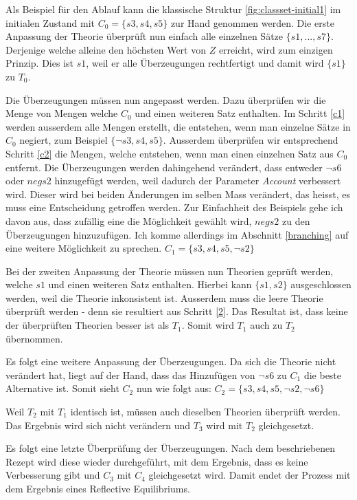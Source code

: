 \documentclass{article}
\begin{document}
 Als Beispiel für den Ablauf kann die klassische Struktur \ref{fig:classset-initial1} im initialen Zustand mit $C_0 = \{s3, s4, s5\}$ zur Hand genommen werden. Die erste Anpassung der Theorie überprüft nun einfach alle einzelnen Sätze $\{s1,...,s7\}$. Derjenige welche alleine den höchsten Wert von $Z$ erreicht, wird zum einzigen Prinzip. Dies ist $s1$, weil er alle Überzeugungen rechtfertigt und damit wird $\{s1\}$ zu $T_0$.
 
 Die Überzeugungen müssen nun angepasst werden. Dazu überprüfen wir die Menge von Mengen welche $C_0$ und einen weiteren Satz enthalten. Im Schritt \ref{c1} werden ausserdem alle Mengen erstellt, die entstehen, wenn man einzelne Sätze in $C_0$ negiert, zum Beispiel $\{\lnot s3, s4, s5\}$. Ausserdem überprüfen wir entsprechend Schritt \ref{c2} die Mengen, welche entstehen, wenn man einen einzelnen Satz aus $C_0$ entfernt. Die Überzeugungen werden dahingehend verändert, dass entweder $\neg s6$ oder $neg s2$ hinzugefügt werden, weil dadurch der Parameter \textit{Account} verbessert wird. Dieser wird bei beiden Änderungen im selben Mass verändert, das heisst, es muss eine Entscheidung getroffen werden. Zur Einfachheit des Beispiels gehe ich davon aus, dass zufällig eine die Möglichkeit gewählt wird, $neg s2$ zu den Überzeugungen hinzuzufügen. Ich komme allerdings im Abschnitt \ref{branching} auf eine weitere Möglichkeit zu sprechen. $C_1 = \{s3, s4, s5, \neg s2\}$
 
 Bei der zweiten Anpassung der Theorie müssen nun Theorien geprüft werden, welche $s1$ und einen weiteren Satz enthalten. Hierbei kann $\{s1,s2\}$ ausgeschlossen werden, weil die Theorie inkonsistent ist. Ausserdem muss die leere Theorie überprüft werden - denn sie resultiert aus Schritt \ref{2}. Das Resultat ist, dass keine der überprüften Theorien besser ist als $T_1$. Somit wird $T_1$ auch zu $T_2$ übernommen.
 
 Es folgt eine weitere Anpassung der Überzeugungen. Da sich die Theorie nicht verändert hat, liegt auf der Hand, dass das Hinzufügen von $\neg s6$ zu $C_1$ die beste Alternative ist. Somit sieht $C_2$ nun wie folgt aus: $C_2 = \{s3, s4, s5, \neg s2, \neg s6\}$
 
 Weil $T_2$ mit $T_1$ identisch ist, müssen auch dieselben Theorien überprüft werden. Das Ergebnis wird sich nicht verändern und $T_3$ wird mit $T_2$ gleichgesetzt.
 
 Es folgt eine letzte Überprüfung der Überzeugungen. Nach dem beschriebenen Rezept wird diese wieder durchgeführt, mit dem Ergebnis, dass es keine Verbesserung gibt und $C_3$ mit $C_4$ gleichgesetzt wird. Damit endet der Prozess mit dem Ergebnis eines Reflective Equilibriums.
 
\end{document}
